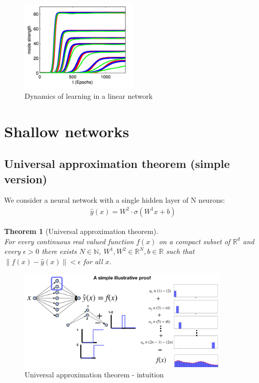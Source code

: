 \documentclass[11pt]{book} %
\newtheorem{theorem}{Theorem}[section]
\begin{document}
\begin{figure}
    \centering
    \includegraphics[width=0.5\textwidth]{Figs/dynamics_linear_network.jpeg}
    \caption{Dynamics of learning in a linear network}
    \label{fig:linear_network}
\end{figure}

%
%
%

\section{Shallow networks}

\subsection{Universal approximation theorem (simple version)}
We consider a neural network with a single hidden layer of N neurons: 
\begin{align*}
    \hat{y}(x) = W^2  \cdot \sigma(W^1 x + b)
\end{align*}
\begin{theorem}[Universal approximation theorem]\ \\
For every continuous real valued function $f(x)$ on a compact subset of $\mathbb{R}^d$ and every $\epsilon > 0$  
there exists $N \in \mathbb{N}$, $W^1, W^2 \in \mathbb{R}^N, b \in \mathbb{R}$ such that $\lVert f(x) - \hat{y}(x) \rVert < \epsilon$ for all $x$.
\end{theorem}

\begin{figure}
    \centering
    \includegraphics[width=0.9\textwidth]{Figs/universal_approx_thm.jpeg}
    \caption{Universal approximation theorem - intuition}
    \label{fig:universal_approximation}
\end{figure}
\end{document}
